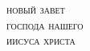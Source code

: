 \thispagestyle{empty}
\vspace*{3cm}
\begin{center}
\Huge\scshape
новый завет\\[1cm]
\Large
господа нашего\\[1cm]
\Huge
иисуса христа\\
\end{center}
\vfill
